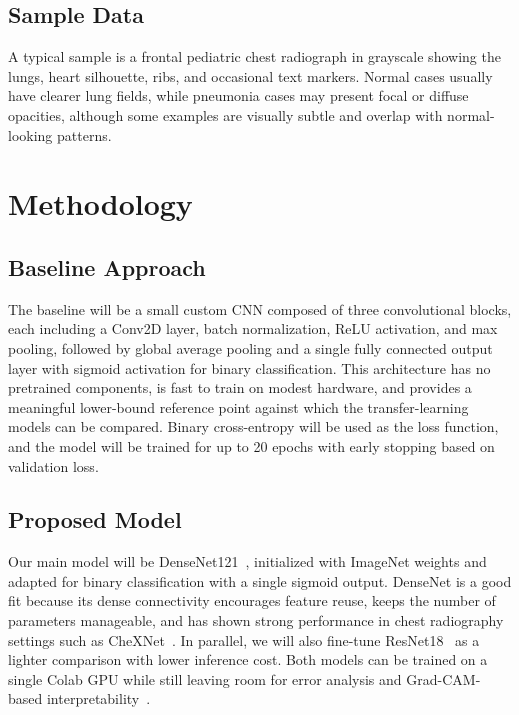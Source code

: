 \documentclass[acmsmall,screen,nonacm]{acmart}
\begin{document}
\subsection{Sample Data}
A typical sample is a frontal pediatric chest radiograph in grayscale showing the lungs, heart silhouette, ribs, and occasional text markers. Normal cases usually have clearer lung fields, while pneumonia cases may present focal or diffuse opacities, although some examples are visually subtle and overlap with normal-looking patterns.

\section{Methodology}

\subsection{Baseline Approach}
The baseline will be a small custom CNN composed of three convolutional blocks, each including a Conv2D layer, batch normalization, ReLU activation, and max pooling, followed by global average pooling and a single fully connected output layer with sigmoid activation for binary classification. This architecture has no pretrained components, is fast to train on modest hardware, and provides a meaningful lower-bound reference point against which the transfer-learning models can be compared. Binary cross-entropy will be used as the loss function, and the model will be trained for up to 20 epochs with early stopping based on validation loss.

\subsection{Proposed Model}
Our main model will be DenseNet121~\cite{huang2017densenet}, initialized with ImageNet weights and adapted for binary classification with a single sigmoid output. DenseNet is a good fit because its dense connectivity encourages feature reuse, keeps the number of parameters manageable, and has shown strong performance in chest radiography settings such as CheXNet~\cite{rajpurkar2017chexnet}. In parallel, we will also fine-tune ResNet18~\cite{he2016resnet} as a lighter comparison with lower inference cost. Both models can be trained on a single Colab GPU while still leaving room for error analysis and Grad-CAM-based interpretability~\cite{selvaraju2017gradcam}.
\end{document}
